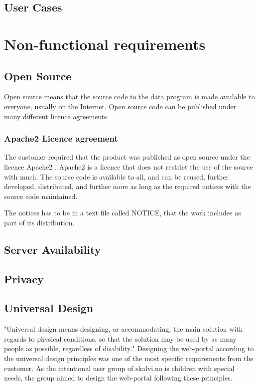 \subsection{User Cases}
\label{User cases}
 
\section{Non-functional requirements}
\subsection{Open Source}
Open source means that the source code to the data program is made available to everyone, usually on the Internet. Open source code can be published under many different licence agreements.

\subsubsection{Apache2 Licence agreement}
The customer required that the product was published as open source under the licence Apache2 \cite{apache2}. Apache2 is a licence that does not restrict the use of the source with much. The source code is available to all, and can be reused, further developed, distributed, and further more as long as the required notices with the source code maintained. 

The notices has to be in a text file called NOTICE, that the work includes as part of its distribution.


\subsection{Server Availability}

\subsection{Privacy}

\subsection{Universal Design}
\label{universalDesign}
"Universal design means designing, or accommodating, the main solution with regards to physical conditions, so that the solution may be used by as many people as possible, regardless of disability." \cite{Difi} Designing the web-portal according to the universal design principles was one of the most specific requirements from the customer. As the intentional user group of skalvi.no is children with special needs, the group aimed to design the web-portal following these principles. 


